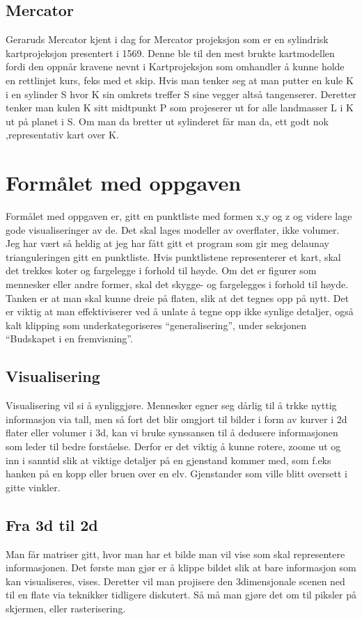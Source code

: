 \documentclass[norsk]{article}
\begin{document}
\subsection{Mercator}
Geraruds Mercator kjent i dag for Mercator projeksjon som er en
sylindrisk kartprojeksjon presentert i 1569.  Denne ble til den mest
brukte kartmodellen fordi den oppnår kravene nevnt i Kartprojeksjon
som omhandler å kunne holde en rettlinjet kurs, feks med et skip.
Hvis man tenker seg at man putter en kule K i en sylinder S hvor K sin
omkrets treffer S sine vegger altså tangenserer. Deretter tenker man
kulen K sitt midtpunkt P som projeserer ut for alle landmasser L i K
ut på planet i S. Om man da bretter ut sylinderet får man da, ett godt
nok ,representativ kart over K.

\section{Formålet med oppgaven}
Formålet med oppgaven er, gitt en punktliste med formen x,y og z og videre lage
gode visualiseringer av de. Det skal lages modeller av overflater, ikke volumer.
Jeg har vært så heldig at jeg har fått gitt et program som gir meg delaunay
trianguleringen gitt en punktliste. 
Hvis punktlistene representerer et kart, skal det trekkes koter og fargelegge
i forhold til høyde.
Om det er figurer som mennesker eller andre former, skal det skygge- og 
fargelegges i forhold til høyde. 
Tanken er at man skal kunne dreie på flaten, slik at det tegnes
opp på nytt. Det er viktig at man effektiviserer ved å unlate å tegne opp
ikke synlige detaljer, også kalt klipping som underkategoriseres
 ``generalisering'', under seksjonen ``Budskapet i en fremvisning''.

\subsection{Visualisering}
Visualisering vil si å synliggjøre. Mennesker egner seg dårlig til å trkke
nyttig informasjon via tall, men så fort det blir omgjort til bilder i form av
kurver i 2d flater eller volumer i 3d, kan vi bruke synssansen til å dedusere
informasjonen som leder til bedre forståelse. Derfor er det viktig å kunne
rotere, zoome ut og inn i sanntid slik at viktige detaljer på en gjenstand
kommer med, som f.eks hanken på en kopp eller bruen over en elv. Gjenstander som
ville blitt oversett i gitte vinkler.

\subsection{Fra 3d til 2d}
Man får matriser gitt, hvor man har et bilde man vil vise som skal representere
informasjonen. Det første man gjør er å klippe bildet slik at bare informasjon
som kan visualiseres, vises. Deretter vil man projisere den 3dimensjonale scenen
ned til en flate via teknikker tidligere diskutert. Så må man gjøre det om til
piksler på skjermen, eller rasterisering.
\end{document}
